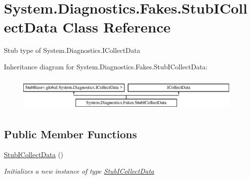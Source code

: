\hypertarget{class_system_1_1_diagnostics_1_1_fakes_1_1_stub_i_collect_data}{\section{System.\-Diagnostics.\-Fakes.\-Stub\-I\-Collect\-Data Class Reference}
\label{class_system_1_1_diagnostics_1_1_fakes_1_1_stub_i_collect_data}
}


Stub type of System.\-Diagnostics.\-I\-Collect\-Data 


Inheritance diagram for System.\-Diagnostics.\-Fakes.\-Stub\-I\-Collect\-Data\-:\begin{figure}[H]
\begin{center}
\leavevmode
\includegraphics[height=1.772152cm]{class_system_1_1_diagnostics_1_1_fakes_1_1_stub_i_collect_data}
\end{center}
\end{figure}
\subsection*{Public Member Functions}
\begin{DoxyCompactItemize}
\item 
\hyperlink{class_system_1_1_diagnostics_1_1_fakes_1_1_stub_i_collect_data_a16a46df065445df4cd624d814e8e7ea1}{Stub\-I\-Collect\-Data} ()
\begin{DoxyCompactList}\small\item\em Initializes a new instance of type \hyperlink{class_system_1_1_diagnostics_1_1_fakes_1_1_stub_i_collect_data}{Stub\-I\-Collect\-Data}\end{DoxyCompactList}\end{DoxyCompactItemize}
